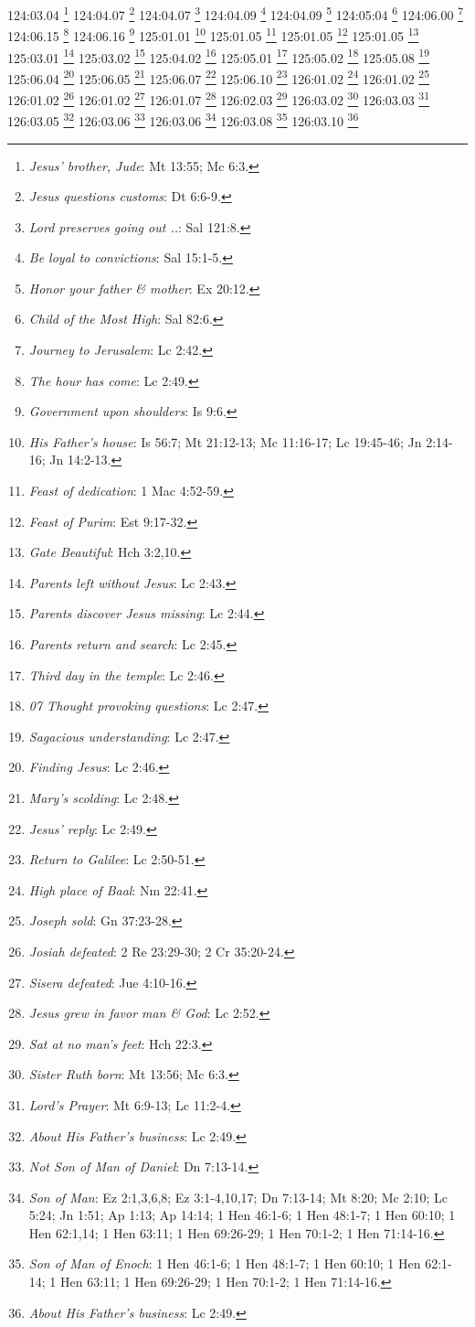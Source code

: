 {{{{{{{{{{{{{{124:03.04 \footnote{\textit{Jesus' brother, Jude}: Mt 13:55; Mc 6:3.}
124:04.07 \footnote{\textit{Jesus questions customs}: Dt 6:6-9.}
124:04.07 \footnote{\textit{Lord preserves going out ..}: Sal 121:8.}
124:04.09 \footnote{\textit{Be loyal to convictions}: Sal 15:1-5.}
124:04.09 \footnote{\textit{Honor your father & mother}: Ex 20:12.}
124:05:04 \footnote{\textit{Child of the Most High}: Sal 82:6.}
124:06.00 \footnote{\textit{Journey to Jerusalem}: Lc 2:42.}
124:06.15 \footnote{\textit{The hour has come}: Lc 2:49.}
124:06.16 \footnote{\textit{Government upon shoulders}: Is 9:6.}
125:01.01 \footnote{\textit{His Father's house}: Is 56:7; Mt 21:12-13; Mc 11:16-17; Lc 19:45-46; Jn 2:14-16; Jn 14:2-13.}
125:01.05 \footnote{\textit{Feast of dedication}: 1 Mac 4:52-59.}
125:01.05 \footnote{\textit{Feast of Purim}: Est 9:17-32.}
125:01.05 \footnote{\textit{Gate Beautiful}: Hch 3:2,10.}
125:03.01 \footnote{\textit{Parents left without Jesus}: Lc 2:43.}
125:03.02 \footnote{\textit{Parents discover Jesus missing}: Lc 2:44.}
125:04.02 \footnote{\textit{Parents return and search}: Lc 2:45.}
125:05.01 \footnote{\textit{Third day in the temple}: Lc 2:46.}
125:05.02 \footnote{\textit{07 Thought provoking questions}: Lc 2:47.}
125:05.08 \footnote{\textit{Sagacious understanding}: Lc 2:47.}
125:06.04 \footnote{\textit{Finding Jesus}: Lc 2:46.}
125:06.05 \footnote{\textit{Mary's scolding}: Lc 2:48.}
125:06.07 \footnote{\textit{Jesus' reply}: Lc 2:49.}
125:06.10 \footnote{\textit{Return to Galilee}: Lc 2:50-51.}
126:01.02 \footnote{\textit{High place of Baal}: Nm 22:41.}
126:01.02 \footnote{\textit{Joseph sold}: Gn 37:23-28.}
126:01.02 \footnote{\textit{Josiah defeated}: 2 Re 23:29-30; 2 Cr 35:20-24.}
126:01.02 \footnote{\textit{Sisera defeated}: Jue 4:10-16.}
126:01.07 \footnote{\textit{Jesus grew in favor man & God}: Lc 2:52.}
126:02.03 \footnote{\textit{Sat at no man's feet}: Hch 22:3.}
126:03.02 \footnote{\textit{Sister Ruth born}: Mt 13:56; Mc 6:3.}
126:03.03 \footnote{\textit{Lord's Prayer}: Mt 6:9-13; Lc 11:2-4.}
126:03.05 \footnote{\textit{About His Father's business}: Lc 2:49.}
126:03.06 \footnote{\textit{Not Son of Man of Daniel}: Dn 7:13-14.}
126:03.06 \footnote{\textit{Son of Man}: Ez 2:1,3,6,8; Ez 3:1-4,10,17; Dn 7:13-14; Mt 8:20; Mc 2:10; Lc 5:24; Jn 1:51; Ap 1:13; Ap 14:14; 1 Hen 46:1-6; 1 Hen 48:1-7; 1 Hen 60:10; 1 Hen 62:1,14; 1 Hen 63:11; 1 Hen 69:26-29; 1 Hen 70:1-2; 1 Hen 71:14-16.}
126:03.08 \footnote{\textit{Son of Man of Enoch}: 1 Hen 46:1-6; 1 Hen 48:1-7; 1 Hen 60:10; 1 Hen 62:1-14; 1 Hen 63:11; 1 Hen 69:26-29; 1 Hen 70:1-2; 1 Hen 71:14-16.}
126:03.10 \footnote{\textit{About His Father's business}: Lc 2:49.}
}}}}}}}}}}}}}}
